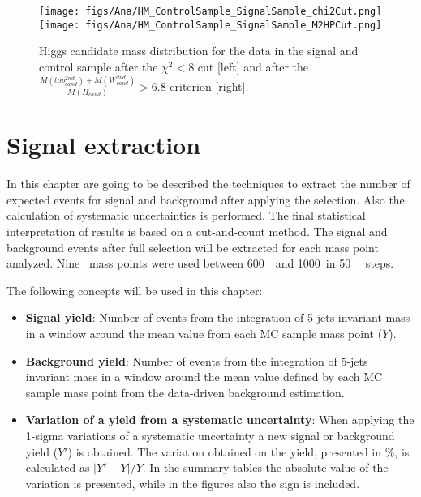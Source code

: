 \begin{figure}[!Hhtbp]
  \begin{center}
    \texttt{[image: figs/Ana/HM\_ControlSample\_SignalSample\_chi2Cut.png]}
    \texttt{[image: figs/Ana/HM\_ControlSample\_SignalSample\_M2HPCut.png]}
    \caption{Higgs candidate mass distribution for the data in the signal and control sample after the $\chi^{2}<8$ cut [left] and after the $\frac{M(top^{2nd}_{cand})+M(W^{2nd}_{cand})}{M(H_{cand})}>6.8$ criterion [right].}
    \label{fig:HiggsMassCSSS}
  \end{center}
\end{figure}

\chapter[Signal extraction]{Signal extraction}
\label{chap:sigexct}

In this chapter are going to be described the techniques to extract the number of expected events for signal and background after applying the selection. Also the calculation of systematic uncertainties is performed. The final statistical interpretation of results is based on a cut-and-count method. The signal and background events after full selection will be extracted for each mass point analyzed. Nine \Tp~mass points were used between 600~\GeVcc~and 1000~\GeVcc in 50~\GeVcc~ steps.

The following concepts will be used in this chapter:
\begin{itemize}
\item \textbf{Signal yield}: Number of events from the integration of 5-jets invariant mass in a window around the mean value from each MC sample mass point ($Y$).
\item \textbf{Background yield}: Number of events from the integration of 5-jets invariant mass in a window around the mean value defined by each MC sample mass point from the data-driven background estimation.
\item \textbf{Variation of a yield from a systematic uncertainty}: When applying the 1-sigma variations of a systematic uncertainty a new signal or background yield ($Y'$) is obtained. The variation obtained on the yield, presented in \%, is calculated as $|Y'-Y|/Y$. In the summary tables the absolute value of the variation is presented, while in the figures also the sign is included.
\end{itemize}

